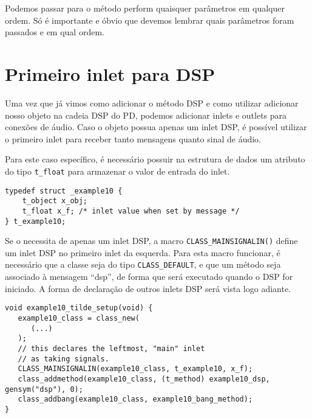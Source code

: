 Podemos passar para o método perform quaisquer parâmetros em qualquer ordem.
Só é importante e óbvio que devemos lembrar quais parâmetros foram passados e
em qual ordem.

\section{Primeiro inlet para DSP}

Uma vez que já vimos como adicionar o método DSP e como utilizar adicionar nosso
objeto na cadeia DSP do PD, podemos adicionar inlets e outlets para conexões de
áudio.
Caso o objeto possua apenas um inlet DSP, é possível utilizar o primeiro inlet
para receber tanto mensagens quanto sinal de áudio.

Para este caso específico, é necessário possuir na estrutura de dados um atributo do
tipo \texttt{t\_float} para armazenar o valor de entrada do inlet.

\begin{lstlisting}[caption=Estrutura de dados para utilizar o primeiro inlet para áudio]
typedef struct _example10 {
    t_object x_obj;
    t_float x_f; /* inlet value when set by message */
} t_example10;
\end{lstlisting}

Se o \external necessita de apenas um inlet DSP, a macro
\texttt{CLASS\_MAINSIGNALIN()} define um inlet DSP no primeiro inlet da
esquerda.
Para esta macro funcionar, é necessário que a classe seja do tipo
\texttt{CLASS\_DEFAULT}, e que um método seja associado à mensagem ``dsp'', de
forma que será executado quando o DSP for iniciado.
A forma de declaração de outros inlets DSP será vista logo adiante.

\begin{lstlisting}[caption=Definição da macro que permite ao primeiro inlet receber sinal de áudio]
void example10_tilde_setup(void) {
   example10_class = class_new(
      (...)
   );
   // this declares the leftmost, "main" inlet
   // as taking signals.
   CLASS_MAINSIGNALIN(example10_class, t_example10, x_f);
   class_addmethod(example10_class, (t_method) example10_dsp, gensym("dsp"), 0);
   class_addbang(example10_class, example10_bang_method);
}
\end{lstlisting}

